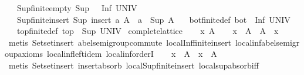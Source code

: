 \begin{isabellebody}
\ \ \ Sup{\isacharunderscore}{\kern0pt}finite{\isacharunderscore}{\kern0pt}empty{\isacharcolon}{\kern0pt}\ {\isachardoublequoteopen}Sup\ {\isacharbraceleft}{\kern0pt}{\isacharbraceright}{\kern0pt}\ {\isacharequal}{\kern0pt}\ Inf\ UNIV{\isachardoublequoteclose}\isanewline
\ \ \ Sup{\isacharunderscore}{\kern0pt}finite{\isacharunderscore}{\kern0pt}insert{\isacharcolon}{\kern0pt}\ {\isachardoublequoteopen}Sup\ {\isacharparenleft}{\kern0pt}insert\ a\ A{\isacharparenright}{\kern0pt}\ {\isacharequal}{\kern0pt}\ a\ {\isasymsqunion}\ Sup\ A{\isachardoublequoteclose}\isanewline
\ \ \ bot{\isacharunderscore}{\kern0pt}finite{\isacharunderscore}{\kern0pt}def{\isacharcolon}{\kern0pt}\ {\isachardoublequoteopen}bot\ {\isacharequal}{\kern0pt}\ Inf\ UNIV{\isachardoublequoteclose}\isanewline
\ \ \ top{\isacharunderscore}{\kern0pt}finite{\isacharunderscore}{\kern0pt}def{\isacharcolon}{\kern0pt}\ {\isachardoublequoteopen}top\ {\isacharequal}{\kern0pt}\ Sup\ UNIV{\isachardoublequoteclose}\isanewline
{}\isanewline
\isanewline
{}\isamarkupfalse%
\ complete{\isacharunderscore}{\kern0pt}lattice\isanewline
%
\isadelimproof
%
\endisadelimproof
%
\isatagproof
{}\isamarkupfalse%
\isanewline
\ \ \isamarkupfalse%
\ x\ A\isanewline
\ \ \isamarkupfalse%
\ {\isachardoublequoteopen}x\ {\isasymin}\ A\ {\isasymLongrightarrow}\ {\isasymSqinter}A\ {\isasymle}\ x{\isachardoublequoteclose}\isanewline
\ \ \ \ \isamarkupfalse%
\ {\isacharparenleft}{\kern0pt}metis\ Set{\isachardot}{\kern0pt}set{\isacharunderscore}{\kern0pt}insert\ abel{\isacharunderscore}{\kern0pt}semigroup{\isachardot}{\kern0pt}commute\ local{\isachardot}{\kern0pt}Inf{\isacharunderscore}{\kern0pt}finite{\isacharunderscore}{\kern0pt}insert\ local{\isachardot}{\kern0pt}inf{\isachardot}{\kern0pt}abel{\isacharunderscore}{\kern0pt}semigroup{\isacharunderscore}{\kern0pt}axioms\ local{\isachardot}{\kern0pt}inf{\isachardot}{\kern0pt}left{\isacharunderscore}{\kern0pt}idem\ local{\isachardot}{\kern0pt}inf{\isachardot}{\kern0pt}orderI{\isacharparenright}{\kern0pt}\isanewline
\ \ \isamarkupfalse%
\ {\isachardoublequoteopen}x\ {\isasymin}\ A\ {\isasymLongrightarrow}\ x\ {\isasymle}\ {\isasymSqunion}A{\isachardoublequoteclose}\isanewline
\ \ \ \ \isamarkupfalse%
\ {\isacharparenleft}{\kern0pt}metis\ Set{\isachardot}{\kern0pt}set{\isacharunderscore}{\kern0pt}insert\ insert{\isacharunderscore}{\kern0pt}absorb{}\ local{\isachardot}{\kern0pt}Sup{\isacharunderscore}{\kern0pt}finite{\isacharunderscore}{\kern0pt}insert\ local{\isachardot}{\kern0pt}sup{\isachardot}{\kern0pt}absorb{\isacharunderscore}{\kern0pt}iff{}{\isacharparenright}{\kern0pt}\isanewline

\end{isabellebody}
